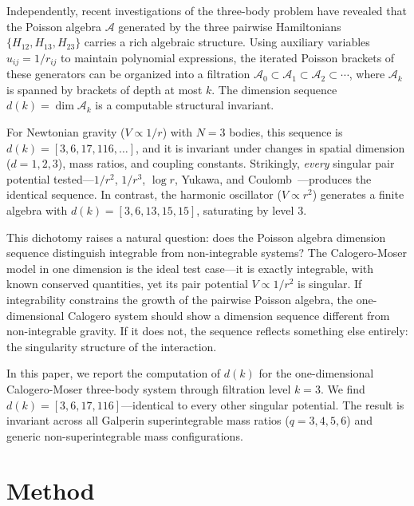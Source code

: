 \documentclass[aps,prl,twocolumn,superscriptaddress,showpacs]{revtex4-2}
\newcommand{\calA}{\mathcal{A}}
\begin{document}
Independently, recent investigations of the three-body problem have
revealed that the Poisson algebra $\calA$ generated by the three
pairwise Hamiltonians $\{H_{12}, H_{13}, H_{23}\}$ carries a rich
algebraic structure.  Using auxiliary variables $u_{ij} = 1/r_{ij}$ to
maintain polynomial expressions, the iterated Poisson brackets of
these generators can be organized into a filtration
$\calA_0 \subset \calA_1 \subset \calA_2 \subset \cdots$, where
$\calA_k$ is spanned by brackets of depth at most $k$.  The dimension
sequence $d(k) = \dim \calA_k$ is a computable structural invariant.

For Newtonian gravity ($V \propto 1/r$) with $N = 3$ bodies, this
sequence is $d(k) = [3, 6, 17, 116, \ldots]$, and it is invariant
under changes in spatial dimension ($d = 1, 2, 3$), mass ratios, and
coupling constants.  Strikingly, \emph{every} singular pair potential
tested---$1/r^2$, $1/r^3$, $\log r$, Yukawa, and
Coulomb~\cite{paper1,paper3}---produces the identical sequence.  In contrast, the harmonic oscillator
($V \propto r^2$) generates a finite algebra with $d(k) = [3, 6, 13,
15, 15]$, saturating by level 3.

This dichotomy raises a natural question: does the Poisson algebra
dimension sequence distinguish integrable from non-integrable systems?
The Calogero-Moser model in one dimension is the ideal test case---it
is exactly integrable, with known conserved quantities, yet its pair
potential $V \propto 1/r^2$ is singular.  If integrability constrains
the growth of the pairwise Poisson algebra, the one-dimensional
Calogero system should show a dimension sequence different from
non-integrable gravity.  If it does not, the sequence reflects
something else entirely: the singularity structure of the interaction.

In this paper, we report the computation of $d(k)$ for the
one-dimensional Calogero-Moser three-body system through filtration
level $k = 3$.  We find $d(k) = [3, 6, 17, 116]$---identical to every
other singular potential.  The result is invariant across all Galperin
superintegrable mass ratios ($q = 3, 4, 5, 6$) and generic
non-superintegrable mass configurations.


\section{Method}
\label{sec:method}
\end{document}
